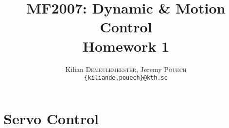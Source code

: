 \documentclass[a4paper,10pt,twocolumn]{article}
\title{MF2007: Dynamic \& Motion Control \\ Homework 1}
\author{Kilian \textsc{Demeulemeester}, Jeremy \textsc{Pouech} \\ \texttt{\{kiliande,pouech\}@kth.se}}
\begin{document}
\setlength\parindent{0em}

\maketitle

\tableofcontents

\begin{abstract}
 
\end{abstract}
  

\part*{Servo Control} 

	

\clearpage
\end{document}
